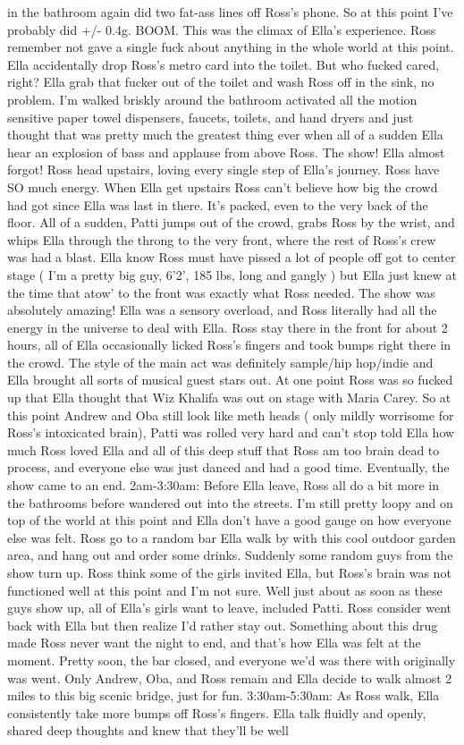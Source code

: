 \documentclass[12pt]{book}
\begin{document}
in the bathroom again did two fat-ass lines off Ross's phone. So at this point I've probably did +/- 0.4g. BOOM. This was the climax of Ella's experience. Ross remember not gave a single fuck about anything in the whole world at this point. Ella accidentally drop Ross's metro card into the toilet. But who fucked cared, right? Ella grab that fucker out of the toilet and wash Ross off in the sink, no problem. I'm walked briskly around the bathroom activated all the motion sensitive paper towel dispensers, faucets, toilets, and hand dryers and just thought that was pretty much the greatest thing ever when all of a sudden Ella hear an explosion of bass and applause from above Ross. The show! Ella almost forgot! Ross head upstairs, loving every single step of Ella's journey. Ross have SO much energy. When Ella get upstairs Ross can't believe how big the crowd had got since Ella was last in there. It's packed, even to the very back of the floor. All of a sudden, Patti jumps out of the crowd, grabs Ross by the wrist, and whips Ella through the throng to the very front, where the rest of Ross's crew was had a blast. Ella know Ross must have pissed a lot of people off got to center stage ( I'm a pretty big guy, 6'2', 185 lbs, long and gangly ) but Ella just knew at the time that atow' to the front was exactly what Ross needed. The show was absolutely amazing! Ella was a sensory overload, and Ross literally had all the energy in the universe to deal with Ella. Ross stay there in the front for about 2 hours, all of Ella occasionally licked Ross's fingers and took bumps right there in the crowd. The style of the main act was definitely sample/hip hop/indie and Ella brought all sorts of musical guest stars out. At one point Ross was so fucked up that Ella thought that Wiz Khalifa was out on stage with Maria Carey. So at this point Andrew and Oba still look like meth heads ( only mildly worrisome for Ross's intoxicated brain), Patti was rolled very hard and can't stop told Ella how much Ross loved Ella and all of this deep stuff that Ross am too brain dead to process, and everyone else was just danced and had a good time. Eventually, the show came to an end. 2am-3:30am: Before Ella leave, Ross all do a bit more in the bathrooms before wandered out into the streets. I'm still pretty loopy and on top of the world at this point and Ella don't have a good gauge on how everyone else was felt. Ross go to a random bar Ella walk by with this cool outdoor garden area, and hang out and order some drinks. Suddenly some random guys from the show turn up. Ross think some of the girls invited Ella, but Ross's brain was not functioned well at this point and I'm not sure. Well just about as soon as these guys show up, all of Ella's girls want to leave, included Patti. Ross consider went back with Ella but then realize I'd rather stay out. Something about this drug made Ross never want the night to end, and that's how Ella was felt at the moment. Pretty soon, the bar closed, and everyone we'd was there with originally was went. Only Andrew, Oba, and Ross remain and Ella decide to walk almost 2 miles to this big scenic bridge, just for fun. 3:30am-5:30am: As Ross walk, Ella consistently take more bumps off Ross's fingers. Ella talk fluidly and openly, shared deep thoughts and knew that they'll be well 
\end{document}
